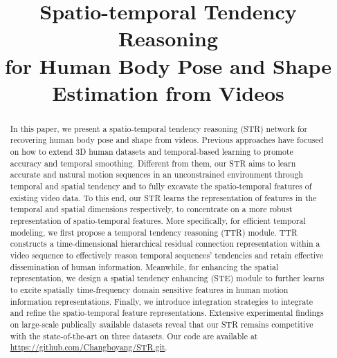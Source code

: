 \documentclass{bmvc2k}
\title{Spatio-temporal Tendency Reasoning \\
for Human Body Pose and Shape Estimation from Videos}
\begin{document}
\maketitle
\begin{abstract}

In this paper, we present a spatio-temporal tendency reasoning (STR) network for recovering human body pose and shape from videos. Previous approaches have focused on how to extend 3D human datasets and temporal-based learning to promote accuracy and temporal smoothing. Different from them, our STR aims to learn accurate and natural motion sequences in an unconstrained environment through temporal and spatial tendency and to fully excavate the spatio-temporal features of existing video data. To this end, our STR learns the representation of features in the temporal and spatial dimensions respectively, to concentrate on a more robust representation of spatio-temporal features. More specifically, for efficient temporal modeling, we first propose a temporal tendency reasoning (TTR) module. TTR constructs a time-dimensional hierarchical residual connection representation within a video sequence to effectively reason temporal sequences' tendencies and retain effective dissemination of human information. Meanwhile, for enhancing the spatial representation, we design a spatial tendency enhancing (STE) module to further learns to excite spatially time-frequency domain sensitive features in human motion information representations. Finally, we introduce integration strategies to integrate and refine the spatio-temporal feature representations. Extensive experimental findings on large-scale publically available datasets reveal that our STR remains competitive with the state-of-the-art on three datasets. Our code are available at \url{https://github.com/Changboyang/STR.git}.
\end{abstract}
\end{document}

